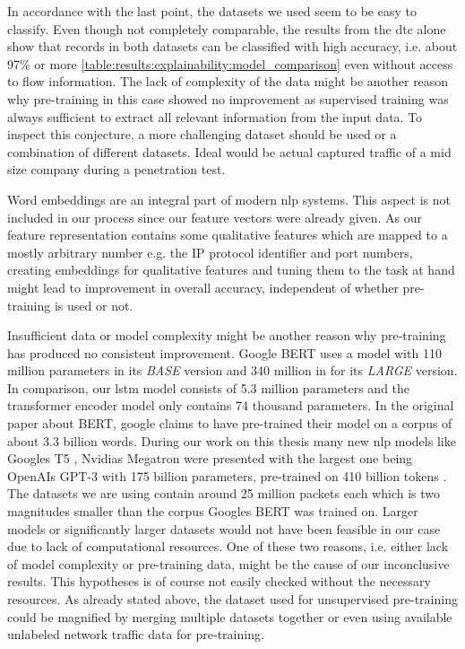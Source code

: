 In accordance with the last point, the datasets we used seem to be easy to classify. Even though not completely comparable, the results from the \gls{dtc} alone show that records in both datasets can be classified with high accuracy, i.e. about 97\% or more \ref{table:results:explainability:model_comparison} even without access to flow information.
The lack of complexity of the data might be another reason why pre-training in this case showed no improvement as supervised training was always sufficient to extract all relevant information from the input data. To inspect this conjecture, a more challenging dataset should be used or a combination of different datasets. Ideal would be actual captured traffic of a mid size company during a penetration test. \par

Word embeddings are an integral part of modern \gls{nlp} systems. This aspect is not included in our process since our feature vectors were already given. As our feature representation contains some qualitative features which are mapped to a mostly arbitrary number e.g. the IP protocol identifier and port numbers, creating embeddings for qualitative features and tuning them to the task at hand might lead to improvement in overall accuracy, independent of whether pre-training is used or not. \par
	
Insufficient data or model complexity might be another reason why pre-training has produced no consistent improvement. Google BERT \cite{bert} uses a model with 110 million parameters in its \textit{BASE} version and 340 million in for its \textit{LARGE} version. In comparison, our \gls{lstm} model consists of 5.3 million parameters and the transformer encoder model only contains 74 thousand parameters. In the original paper about BERT, google claims to have pre-trained their model on a corpus of about 3.3 billion words. During our work on this thesis many new \gls{nlp} models like Googles T5 \cite{google_t5}, Nvidias Megatron \cite{megatron} were presented with the largest one being OpenAIs GPT-3 with 175 billion parameters, pre-trained on 410 billion tokens \cite{gpt3}. The datasets we are using contain around 25 million packets each which is two magnitudes smaller than the corpus Googles BERT was trained on. Larger models or significantly larger datasets would not have been feasible in our case due to lack of computational resources. One of these two reasons, i.e. either lack of model complexity or pre-training data, might be the cause of our inconclusive results. This hypotheses is of course not easily checked without the necessary resources. As already stated above, the dataset used for unsupervised pre-training could be magnified by merging multiple datasets together or even using available unlabeled network traffic data for pre-training. \par

